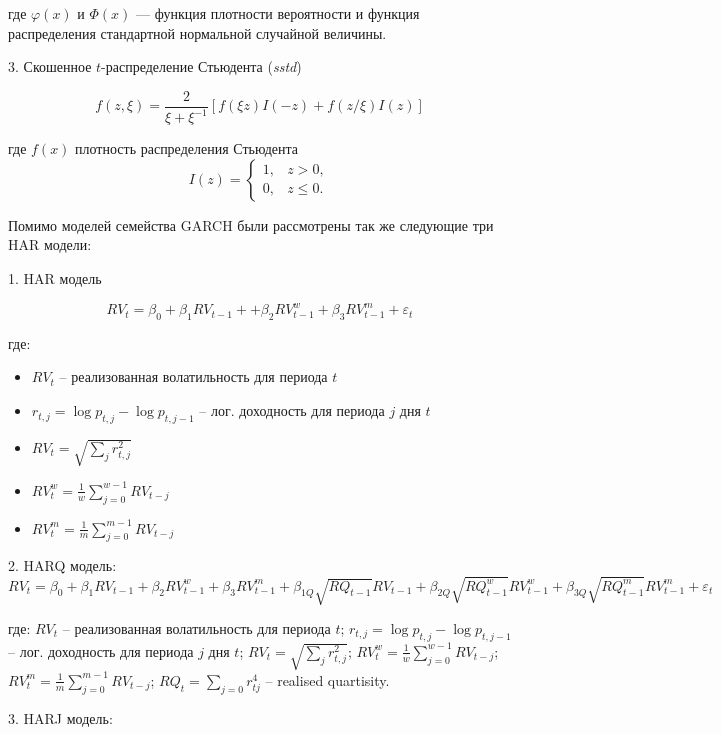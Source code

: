 \documentclass[]{article}
\begin{document}
где \(\varphi(x)\) и \(\Phi(x)\) — функция плотности вероятности и функция распределения стандартной нормальной случайной величины.

3. Скошенное \(t\)-распределение Стьюдента (\textit{sstd}) 

$$f(z, \xi) = \frac{2}{\xi + \xi^{-1}} \left[ f(\xi z) I(-z) + f(z/\xi) I(z) \right]$$

где \(f(x)\) плотность распределения Стьюдента
$$I(z) = 
\begin{cases} 
	1, & z > 0, \\
	0, & z \leq 0. 
\end{cases}
$$

Помимо моделей семейства GARCH были рассмотрены так же следующие три HAR модели:

1. HAR модель

$$RV_t = \beta_0 + \beta_1 RV_{t-1} ++ \beta_2 RV_{t-1}^w + \beta_3 RV_{t-1}^m + \varepsilon_t$$

где:
\begin{itemize}
	
	\item $RV_t$ -- реализованная волатильность для периода $t$
	
	\item $r_{t, j} = \log{p_{t, j}} - \log{p_{t, j-1}}$ -- лог. доходность для периода $j$ дня $t$
	
	\item $RV_{t} = \sqrt{\sum_{j}r_{t, j}^2}$ 
	
	\item $RV_{t}^w = \frac{1}{w}\sum_{j=0}^{w-1}RV_{t-j}$
	
	\item $RV_{t}^m = \frac{1}{m}\sum_{j=0}^{m-1}RV_{t-j}$
	
\end{itemize}

2. HARQ модель:
$$RV_t = \beta_0 + \beta_1 RV_{t-1} + \beta_2 RV_{t-1}^w + \beta_3 RV_{t-1}^m + \beta_{1Q}\sqrt{RQ_{t-1}}RV_{t-1} + \beta_{2Q}\sqrt{RQ_{t-1}^w} RV_{t-1}^w  + \beta_{3Q}\sqrt{RQ_{t-1}^m}RV_{t-1}^m + \varepsilon_{t}$$

где: $RV_t$ -- реализованная волатильность для периода $t$; $r_{t, j} = \log{p_{t, j}} - \log{p_{t, j-1}}$ -- лог. доходность для периода $j$ дня $t$; $RV_{t} = \sqrt{\sum_{j}r_{t, j}^2}$; $RV_{t}^w = \frac{1}{w}\sum_{j=0}^{w-1}RV_{t-j}$; $RV_{t}^m = \frac{1}{m}\sum_{j=0}^{m-1}RV_{t-j}$; $RQ_{t} = \sum_{j=0}r_{tj}^4$	-- realised quartisity.

3. HARJ модель:
\end{document}
